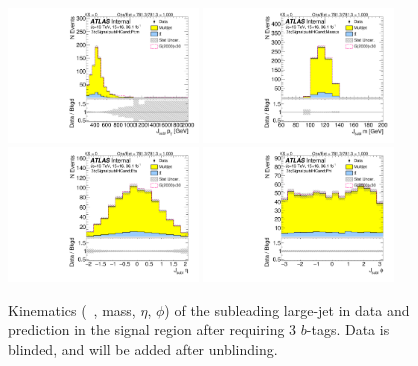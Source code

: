 \begin{figure}[htbp!]
\begin{center}
\includegraphics[width=0.45\textwidth,angle=-90]{figures/boosted/Signal/b77_ThreeTag_Signal_sublHCand_Pt_m_blind.pdf}
\includegraphics[width=0.45\textwidth,angle=-90]{figures/boosted/Signal/b77_ThreeTag_Signal_sublHCand_Mass_s_blind.pdf}\\
\includegraphics[width=0.45\textwidth,angle=-90]{figures/boosted/Signal/b77_ThreeTag_Signal_sublHCand_Eta_blind.pdf}
\includegraphics[width=0.45\textwidth,angle=-90]{figures/boosted/Signal/b77_ThreeTag_Signal_sublHCand_Phi_blind.pdf}
  \caption{Kinematics (\pt~, mass, $\eta$, $\phi$) of the subleading large-\R jet in data and prediction in the signal region after requiring 3 $b$-tags. Data is blinded, and will be added after unblinding.}
  \label{fig:boosted-3b-signal-blind-ak10-subl}
\end{center}
\end{figure}

